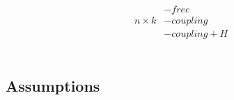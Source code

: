\documentclass[first,firstsupp,lastsupp,last,hyperref,table]{ETHclass}
\begin{document}
\begin{frame}
\begin{columns}[c]
\begin{column}{0.45\textwidth}
\begin{figure}
\end{figure}
\vspace{-0.25cm}
\begin{equation*}
\begin{aligned}
&-free\\
n\times k&-coupling\\
&-coupling+H\\
\end{aligned}
\end{equation*}
\end{column}
\end{columns}
\end{frame}

\subsection{Assumptions}
\end{document}
